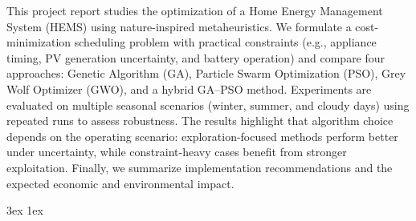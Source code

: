 \documentclass[final,12pt]{ubb_dolgozat}
\begin{document}
\maketitle

\begin{abstractEN}
This project report studies the optimization of a Home Energy Management System (HEMS) using nature-inspired metaheuristics. We formulate a cost-minimization scheduling problem with practical constraints (e.g., appliance timing, PV generation uncertainty, and battery operation) and compare four approaches: Genetic Algorithm (GA), Particle Swarm Optimization (PSO), Grey Wolf Optimizer (GWO), and a hybrid GA--PSO method. Experiments are evaluated on multiple seasonal scenarios (winter, summer, and cloudy days) using repeated runs to assess robustness. The results highlight that algorithm choice depends on the operating scenario: exploration-focused methods perform better under uncertainty, while constraint-heavy cases benefit from stronger exploitation. Finally, we summarize implementation recommendations and the expected economic and environmental impact.
\end{abstractEN}

{ \baselineskip 3ex
  \parskip 1ex
  \tableofcontents
}

\setcounter{page}{1}







\appendix




\end{document}
